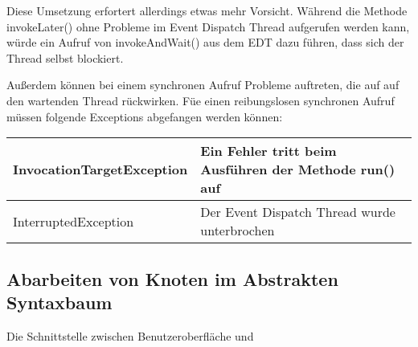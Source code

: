 \begin{enumerate}
\begin{enumerate}
	Diese Umsetzung erfortert allerdings etwas mehr Vorsicht. Während die Methode invokeLater() ohne Probleme im Event Dispatch Thread aufgerufen werden kann, würde ein Aufruf von invokeAndWait() aus dem EDT dazu führen, dass sich der Thread selbst blockiert.
	
	Außerdem können bei einem synchronen Aufruf Probleme auftreten, die auf auf den wartenden Thread rückwirken. Füe einen reibungslosen synchronen Aufruf müssen folgende Exceptions abgefangen werden können:

\def\arraystretch{2.1}
\begin{tabular}{|l|l|}
	\hline
	InvocationTargetException & \parbox{7cm}{Ein Fehler tritt beim Ausführen der Methode run() auf}\\
	\hline
	InterruptedException & \parbox{7cm}{Der Event Dispatch Thread wurde unterbrochen}\\
	\hline
\end{tabular}
\end{enumerate}
\end{enumerate}



\subsection{Abarbeiten von Knoten im Abstrakten Syntaxbaum}
Die Schnittstelle zwischen Benutzeroberfläche und

